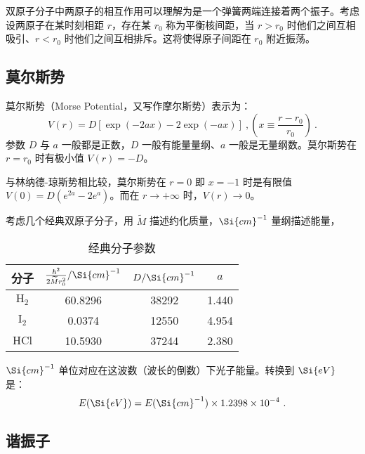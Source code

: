 
双原子分子中两原子的相互作用可以理解为是一个弹簧两端连接着两个振子。考虑设两原子在某时刻相距 $r$，存在某 $r_0$ 称为平衡核间距，当 $r>r_0$ 时他们之间互相吸引、$r<r_0$ 时他们之间互相排斥。这将使得原子间距在 $r_0$ 附近振荡。

\subsection{莫尔斯势}
莫尔斯势（Morse Potential，又写作摩尔斯势）表示为：
\begin{equation}
V(r) = D [\exp(-2ax) - 2\exp(-ax)] \ , \left(x \equiv \frac{r-r_0}{r_0}\right)~.
\end{equation}
参数 $D$ 与 $a$ 一般都是正数，$D$ 一般有能量量纲、$a$ 一般是无量纲数。莫尔斯势在 $r=r_0$ 时有极小值 $V(r)=-D$。

与林纳德-琼斯势相比较，莫尔斯势在 $r = 0$ 即 $x = -1$ 时是有限值 $V(0) = D(e^{2a}-2e^{a})$。而在 $r \rightarrow +\infty$ 时，$V(r) \rightarrow 0$。

考虑几个经典双原子分子，用 $\widetilde{M}$ 描述约化质量，$\Si{cm}^{-1}$ 量纲描述能量，
\begin{table}[ht]
\centering
\caption{经典分子参数}\label{tab_MoPoQM1}
\begin{tabular}{|c|c|c|c|}
\hline
分子 & $\frac{\hbar^2}{2 \widetilde{M} r_0^2}/\Si{cm}^{-1}$ & $D/\Si{cm}^{-1}$ & $a$ \\
\hline
$\text{H}_2$ & 60.8296 & 38292 & 1.440 \\
\hline
$\text{I}_2$ & 0.0374 & 12550 & 4.954 \\
\hline
$\text{HCl}$ & 10.5930 & 37244 & 2.380 \\
\hline
\end{tabular}
\end{table}
$\Si{cm}^{-1}$ 单位对应在这波数（波长的倒数）下光子能量。转换到 $\Si{eV}$ 是：
$$E(\Si{eV}) = E(\Si{cm}^{-1}) \times 1.2398 \times 10^{-4} ~.$$

\subsection{谐振子}
